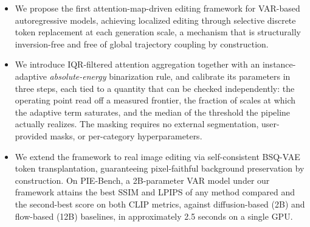 \begin{itemize}
    \item We propose the first attention-map-driven editing framework for VAR-based autoregressive models, achieving localized editing through selective discrete token replacement at each generation scale, a mechanism that is structurally inversion-free and free of global trajectory coupling by construction.

    \item We introduce IQR-filtered attention aggregation together with an instance-adaptive \emph{absolute-energy} binarization rule, and calibrate its parameters in three steps, each tied to a quantity that can be checked independently: the operating point read off a measured frontier, the fraction of scales at which the adaptive term saturates, and the median of the threshold the pipeline actually realizes. The masking requires no external segmentation, user-provided masks, or per-category hyperparameters.

    \item We extend the framework to real image editing via self-consistent BSQ-VAE token transplantation, guaranteeing pixel-faithful background preservation by construction. On PIE-Bench, a 2B-parameter VAR model under our framework attains the best SSIM and LPIPS of any method compared and the second-best score on both CLIP metrics, against diffusion-based (2B) and flow-based (12B) baselines, in approximately 2.5 seconds on a single GPU.

\end{itemize}
